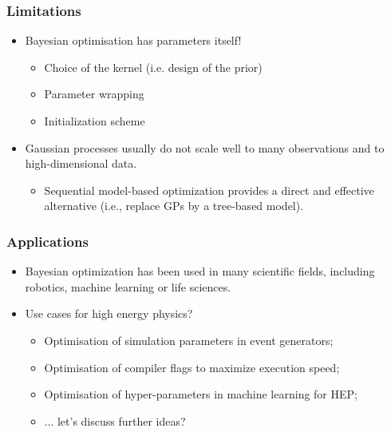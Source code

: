 \documentclass{beamer}
\begin{document}
\begin{frame}
    \frametitle{Limitations}

    \begin{itemize}
        \item Bayesian optimisation has parameters itself!
            \begin{itemize}
                \item Choice of the kernel (i.e. design of the prior)
                \item Parameter wrapping
                \item Initialization scheme
            \end{itemize}

        \vspace{1em}

        \item Gaussian processes usually do not scale well to many observations and to high-dimensional data.
            \begin{itemize}
                \item Sequential model-based optimization provides a direct and effective alternative (i.e., replace GPs by a tree-based model).
            \end{itemize}
    \end{itemize}
\end{frame}

\begin{frame}
    \frametitle{Applications}

    \begin{itemize}
        \item Bayesian optimization has been used in many scientific fields,
        including robotics, machine learning or life sciences.

        \vspace{1em}

        \item Use cases for high energy physics?
            \begin{itemize}
                \item Optimisation of simulation parameters in event generators;
                \item Optimisation of compiler flags to maximize execution speed;
                \item Optimisation of hyper-parameters in machine learning for HEP;
                \item ... let's discuss further ideas?
            \end{itemize}
    \end{itemize}
\end{frame}
\end{document}
